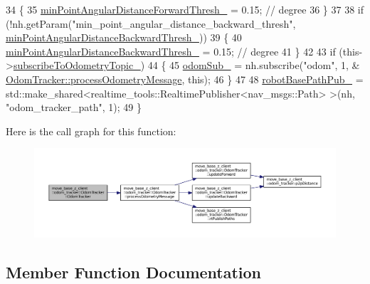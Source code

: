 \begin{DoxyCode}
34     \{
35         \hyperlink{classmove__base__z__client_1_1odom__tracker_1_1OdomTracker_a8675c1d9bd1713d46a467d4aa1aa29a2}{minPointAngularDistanceForwardThresh\_} = 0.15; \textcolor{comment}{// degree}
36     \}
37 
38     \textcolor{keywordflow}{if} (!nh.getParam(\textcolor{stringliteral}{"min\_point\_angular\_distance\_backward\_thresh"}, 
      \hyperlink{classmove__base__z__client_1_1odom__tracker_1_1OdomTracker_ad50ecd0f634a3b9d2f68a54788b8c96a}{minPointAngularDistanceBackwardThresh\_}))
39     \{
40         \hyperlink{classmove__base__z__client_1_1odom__tracker_1_1OdomTracker_ad50ecd0f634a3b9d2f68a54788b8c96a}{minPointAngularDistanceBackwardThresh\_} = 0.15; \textcolor{comment}{// degree}
41     \}
42 
43     \textcolor{keywordflow}{if} (this->\hyperlink{classmove__base__z__client_1_1odom__tracker_1_1OdomTracker_af07071223326ba38fc95037717102bb4}{subscribeToOdometryTopic\_})
44     \{
45         \hyperlink{classmove__base__z__client_1_1odom__tracker_1_1OdomTracker_a6a6b1dcb9f0cfae01007ca949b562ee2}{odomSub\_} = nh.subscribe(\textcolor{stringliteral}{"odom"}, 1, &
      \hyperlink{classmove__base__z__client_1_1odom__tracker_1_1OdomTracker_a79b9f1e3b15fa6ac82dd93ab78e23579}{OdomTracker::processOdometryMessage}, \textcolor{keyword}{this});
46     \}
47 
48     \hyperlink{classmove__base__z__client_1_1odom__tracker_1_1OdomTracker_a3eb6ca9be9504dc3c1da949d1e1daeda}{robotBasePathPub\_} = std::make\_shared<realtime\_tools::RealtimePublisher<nav\_msgs::Path>
      >(nh, \textcolor{stringliteral}{"odom\_tracker\_path"}, 1);
49 \}
\end{DoxyCode}


Here is the call graph for this function\+:
\nopagebreak
\begin{figure}[H]
\begin{center}
\leavevmode
\includegraphics[width=350pt]{classmove__base__z__client_1_1odom__tracker_1_1OdomTracker_ab6d1b57e311a9434a95c112e2f62501f_cgraph}
\end{center}
\end{figure}




\subsection{Member Function Documentation}
